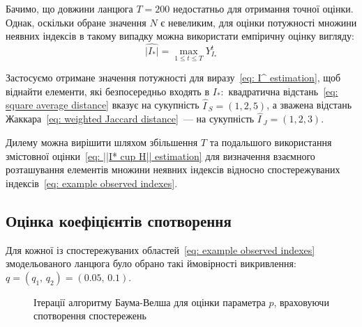 \documentclass[]{iptconf}
\theoremstyle{plain}
\begin{document}
Бачимо, що довжини ланцюга $T=200$ недостатньо для отримання точної оцінки. Однак, оскільки обране значення $N$ є невеликим, для оцінки потужності множини неявних індексів в такому випадку можна використати емпіричну оцінку вигляду:
\begin{equation*}
    \widehat{|I_*|}=\max\limits_{1\leqslant t \leqslant T} Y^t_{I_*}
\end{equation*}

Застосуємо отримане значення потужності для виразу~\eqref{eq: I^ estimation}, щоб віднайти елементи, які безпосередньо входять в $I_*:$ квадратична відстань~\eqref{eq: square average distance} вказує на сукупність $\widehat{I\,}_S=(1,2,5)$, а зважена відстань Жаккара~\eqref{eq: weighted Jaccard distance}~--- на сукупність $\widehat{I\,}_J=(1,2,3)$.

Дилему можна вирішити шляхом збільшення $T$ та подальшого використання змістовної оцінки~\eqref{eq: ||I* cup H|| estimation} для визначення взаємного розташування елементів множини неявних індексів відносно спостережуваних індексів~\eqref{eq: example observed indexes}.

\subsection*{Оцінка коефіцієнтів спотворення}

Для кожної із спостережуваних областей~\eqref{eq: example observed indexes} змодельованого ланцюга було обрано такі ймовірності викривлення: $q = (q_1,\,q_2) = (0.05,\,0.1)$. 

\begin{figure}[H]\centering
    \caption{Ітерації алгоритму Баума-Велша для оцінки параметра $p$, враховуючи спотворення спостережень}
    \label{pic: p distortion baum-welch learning algorithm}
\end{figure}
\end{document}
